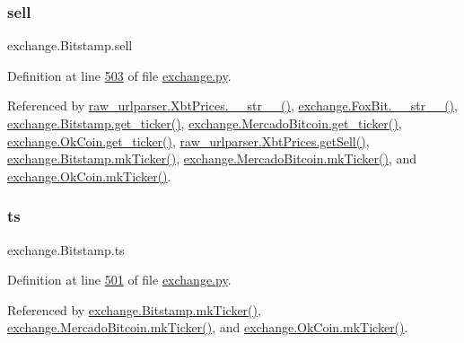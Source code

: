 \subsubsection{\texorpdfstring{sell}{sell}}
{\footnotesize\ttfamily exchange.\+Bitstamp.\+sell}



Definition at line \hyperlink{exchange_8py_source_l00503}{503} of file \hyperlink{exchange_8py_source}{exchange.\+py}.



Referenced by \hyperlink{raw__urlparser_8py_source_l00074}{raw\+\_\+urlparser.\+Xbt\+Prices.\+\_\+\+\_\+str\+\_\+\+\_\+()}, \hyperlink{exchange_8py_source_l00610}{exchange.\+Fox\+Bit.\+\_\+\+\_\+str\+\_\+\+\_\+()}, \hyperlink{exchange_8py_source_l00511}{exchange.\+Bitstamp.\+get\+\_\+ticker()}, \hyperlink{exchange_8py_source_l00651}{exchange.\+Mercado\+Bitcoin.\+get\+\_\+ticker()}, \hyperlink{exchange_8py_source_l00716}{exchange.\+Ok\+Coin.\+get\+\_\+ticker()}, \hyperlink{raw__urlparser_8py_source_l00065}{raw\+\_\+urlparser.\+Xbt\+Prices.\+get\+Sell()}, \hyperlink{exchange_8py_source_l00525}{exchange.\+Bitstamp.\+mk\+Ticker()}, \hyperlink{exchange_8py_source_l00665}{exchange.\+Mercado\+Bitcoin.\+mk\+Ticker()}, and \hyperlink{exchange_8py_source_l00730}{exchange.\+Ok\+Coin.\+mk\+Ticker()}.

\mbox{\label{classexchange_1_1_bitstamp_a8e85011dca7c70ffd1ed5ed398b0ed34}} 
\subsubsection{\texorpdfstring{ts}{ts}}
{\footnotesize\ttfamily exchange.\+Bitstamp.\+ts}



Definition at line \hyperlink{exchange_8py_source_l00501}{501} of file \hyperlink{exchange_8py_source}{exchange.\+py}.



Referenced by \hyperlink{exchange_8py_source_l00525}{exchange.\+Bitstamp.\+mk\+Ticker()}, \hyperlink{exchange_8py_source_l00665}{exchange.\+Mercado\+Bitcoin.\+mk\+Ticker()}, and \hyperlink{exchange_8py_source_l00730}{exchange.\+Ok\+Coin.\+mk\+Ticker()}.

\mbox{\label{classexchange_1_1_bitstamp_ab83fdca31947f7b1a9ff6713945baec0}} 
